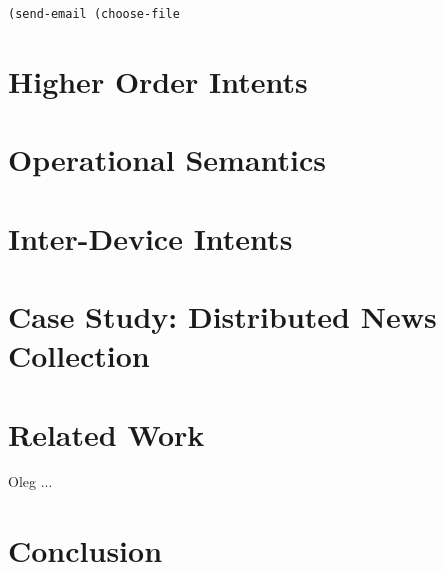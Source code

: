 \documentclass{acm_proc_article-sp}
\begin{document}
\begin{verbatim}
(send-email (choose-file
\end{verbatim}

\section{Higher Order Intents}

\section{Operational Semantics}

\section{Inter-Device Intents}

\section{Case Study: Distributed News Collection}

\section{Related Work}
Oleg \cite{kiselyov:2006} ...

\section{Conclusion}

{}

\end{document}
